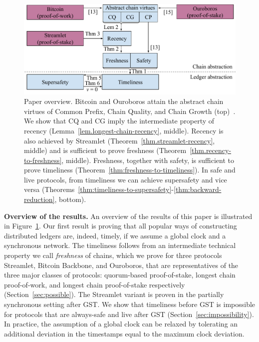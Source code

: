\begin{figure}
  \centering
  \includegraphics[width=1.0\columnwidth,keepaspectratio]{figures/timeliness-overview.pdf}
  \caption{Paper overview. Bitcoin and Ouroboros attain the abstract chain virtues
  of Common Prefix, Chain Quality, and Chain Growth (top)~\cite{backbone,ouroboros}.
  We show that CQ and CG imply the intermediate property of recency (Lemma~\ref{lem.longest-chain-recency}, middle).
  Recency is also achieved by Streamlet (Theorem~\ref{thm.streamlet-recency}, middle) and is sufficient
  to prove freshness (Theorem~\ref{thm.recency-to-freshness}, middle).
  Freshness, together with safety, is sufficient to prove timeliness
  (Theorem~\ref{thm:freshness-to-timeliness}). In safe and live protocols, from timeliness we can achieve supersafety
  and vice versa (Theorems~\ref{thm:timeliness-to-supersafety}-\ref{thm:backward-reduction}, bottom).
  }
 \label{fig:overview}
\end{figure}

\noindent
\textbf{Overview of the results.}
An overview of the results of this paper is illustrated in Figure~\ref{fig:overview}.
Our first result is proving that all popular ways of constructing distributed ledgers
are, indeed, timely, if we assume a global clock and a synchronous network.
The timeliness follows from an intermediate technical property we call \emph{freshness}
of chains, which we prove for three protocols
Streamlet, Bitcoin Backbone, and Ouroboros, that are representatives
of the three major classes of protocols: quorum-based proof-of-stake, longest chain
proof-of-work, and longest chain proof-of-stake respectively (Section~\ref{sec:possible}).
The Streamlet variant is proven in the partially synchronous setting after GST.
We show that timeliness before GST is impossible for protocols that are always-safe
and live after GST (Section~\ref{sec:impossibility}).
In practice, the assumption of a global clock can be relaxed by tolerating an additional deviation in the timestamps equal to the maximum clock deviation.

